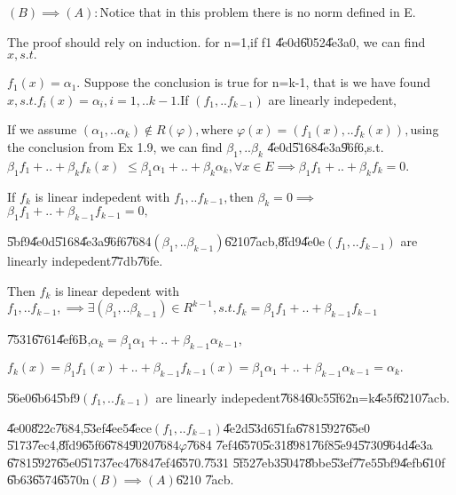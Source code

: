 \documentclass{article}
\begin{document}
$\left( B\right) \implies \left( A\right) :$Notice that in this problem
there is no norm defined in E.

The proof should rely on induction. for n=1,if f1 \U{4e0d}\U{6052}\U{4e3a}0,
we can find $x,s.t.$

$f_{1}\left( x\right) =\alpha _{1}.$ Suppose the conclusion is true for
n=k-1, that is we have found $x,s.t.f_{i}\left( x\right) =\alpha
_{i},i=1,..k-1.$If $\left( f_{1},..f_{k-1}\right) $ are linearly indepedent$,
$

If we assume $\left( \alpha _{1},..\alpha _{k}\right) \notin R\left( \varphi
\right) ,$where $\varphi \left( x\right) =\left( f_{1}\left( x\right)
,..f_{k}\left( x\right) \right) ,$using the conclusion from Ex 1.9, we can
find $\beta _{1},..\beta _{k}$ \U{4e0d}\U{5168}\U{4e3a}\U{96f6},s.t. $\beta
_{1}f_{1}+..+\beta _{k}f_{k}\left( x\right) $ $\leq \beta _{1}\alpha
_{1}+..+\beta _{k}\alpha _{k},\forall x\in E\implies \beta
_{1}f_{1}+..+\beta _{k}f_{k}=0.$

\bigskip If $f_{k}$ is linear indepedent with $f_{1},..f_{k-1},$then $\beta
_{k}=0\implies $ $\beta _{1}f_{1}+..+\beta _{k-1}f_{k-1}=0,$

\U{5bf9}\U{4e0d}\U{5168}\U{4e3a}\U{96f6}\U{7684}$\left( \beta _{1},..\beta
_{k-1}\right) $\U{6210}\U{7acb},\U{8fd9}\U{4e0e}$\left(
f_{1},..f_{k-1}\right) $ are linearly indepedent\U{77db}\U{76fe}.

Then $f_{k}$ is linear depedent with $f_{1},..f_{k-1},\implies \exists
\left( \beta _{1},..\beta _{k-1}\right) \in R^{k-1},s.t.f_{k}=\beta
_{1}f_{1}+..+\beta _{k-1}f_{k-1}$

\U{7531}\U{6761}\U{4ef6}B,$\alpha _{k}=\beta _{1}\alpha _{1}+..+\beta
_{k-1}\alpha _{k-1},$

$f_{k}\left( x\right) =\beta _{1}f_{1}\left( x\right) +..+\beta
_{k-1}f_{k-1}\left( x\right) =\beta _{1}\alpha _{1}+..+\beta _{k-1}\alpha
_{k-1}=\alpha _{k}.$

\U{56e0}\U{6b64}\U{5bf9}$\left( f_{1},..f_{k-1}\right) $ are linearly
indepedent\U{7684}\U{60c5}\U{5f62}n=k\U{4e5f}\U{6210}\U{7acb}.

\U{4e00}\U{822c}\U{7684},\U{53ef}\U{4ee5}\U{4ece}$\left(
f_{1},..f_{k-1}\right) $\U{4e2d}\U{53d6}\U{51fa}\U{6781}\U{5927}\U{65e0}%
\U{5173}\U{7ec4},\U{8fd9}\U{65f6}\U{6784}\U{9020}\U{7684}$\varphi $\U{7684}%
\U{7ef4}\U{6570}\U{5c31}\U{8981}\U{76f8}\U{5e94}\U{5730}\U{964d}\U{4e3a}%
\U{6781}\U{5927}\U{65e0}\U{5173}\U{7ec4}\U{7684}\U{7ef4}\U{6570}.\U{7531}%
\U{5f52}\U{7eb3}\U{5047}\U{8bbe}\U{53ef}\U{77e5}\U{5bf9}\U{4efb}\U{610f}%
\U{6b63}\U{6574}\U{6570}n$\left( B\right) \implies \left( A\right) $\U{6210}%
\U{7acb}.
\end{document}
